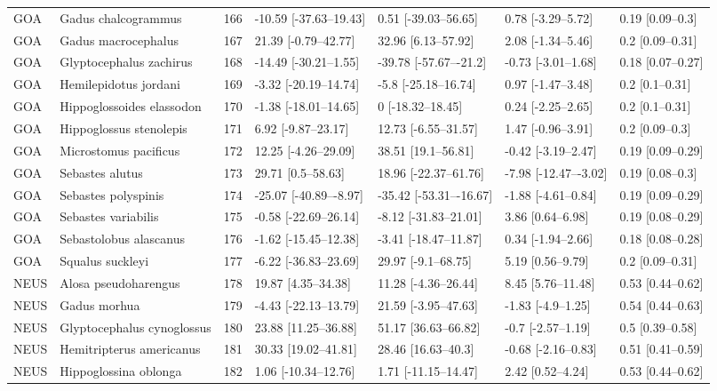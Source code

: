 \begin{longtable}[t]{lllllll}
\addlinespace
GOA & Gadus chalcogrammus & 166 & -10.59 [-37.63–19.43] & 0.51 [-39.03–56.65] & 0.78 [-3.29–5.72] & 0.19 [0.09–0.3]\\
GOA & Gadus macrocephalus & 167 & 21.39 [-0.79–42.77] & 32.96 [6.13–57.92] & 2.08 [-1.34–5.46] & 0.2 [0.09–0.31]\\
GOA & Glyptocephalus zachirus & 168 & -14.49 [-30.21–1.55] & -39.78 [-57.67–-21.2] & -0.73 [-3.01–1.68] & 0.18 [0.07–0.27]\\
GOA & Hemilepidotus jordani & 169 & -3.32 [-20.19–14.74] & -5.8 [-25.18–16.74] & 0.97 [-1.47–3.48] & 0.2 [0.1–0.31]\\
GOA & Hippoglossoides elassodon & 170 & -1.38 [-18.01–14.65] & 0 [-18.32–18.45] & 0.24 [-2.25–2.65] & 0.2 [0.1–0.31]\\
\addlinespace
GOA & Hippoglossus stenolepis & 171 & 6.92 [-9.87–23.17] & 12.73 [-6.55–31.57] & 1.47 [-0.96–3.91] & 0.2 [0.09–0.3]\\
GOA & Microstomus pacificus & 172 & 12.25 [-4.26–29.09] & 38.51 [19.1–56.81] & -0.42 [-3.19–2.47] & 0.19 [0.09–0.29]\\
GOA & Sebastes alutus & 173 & 29.71 [0.5–58.63] & 18.96 [-22.37–61.76] & -7.98 [-12.47–-3.02] & 0.19 [0.08–0.3]\\
GOA & Sebastes polyspinis & 174 & -25.07 [-40.89–-8.97] & -35.42 [-53.31–-16.67] & -1.88 [-4.61–0.84] & 0.19 [0.09–0.29]\\
GOA & Sebastes variabilis & 175 & -0.58 [-22.69–26.14] & -8.12 [-31.83–21.01] & 3.86 [0.64–6.98] & 0.19 [0.08–0.29]\\
\addlinespace
GOA & Sebastolobus alascanus & 176 & -1.62 [-15.45–12.38] & -3.41 [-18.47–11.87] & 0.34 [-1.94–2.66] & 0.18 [0.08–0.28]\\
GOA & Squalus suckleyi & 177 & -6.22 [-36.83–23.69] & 29.97 [-9.1–68.75] & 5.19 [0.56–9.79] & 0.2 [0.09–0.31]\\
NEUS & Alosa pseudoharengus & 178 & 19.87 [4.35–34.38] & 11.28 [-4.36–26.44] & 8.45 [5.76–11.48] & 0.53 [0.44–0.62]\\
NEUS & Gadus morhua & 179 & -4.43 [-22.13–13.79] & 21.59 [-3.95–47.63] & -1.83 [-4.9–1.25] & 0.54 [0.44–0.63]\\
NEUS & Glyptocephalus cynoglossus & 180 & 23.88 [11.25–36.88] & 51.17 [36.63–66.82] & -0.7 [-2.57–1.19] & 0.5 [0.39–0.58]\\
\addlinespace
NEUS & Hemitripterus americanus & 181 & 30.33 [19.02–41.81] & 28.46 [16.63–40.3] & -0.68 [-2.16–0.83] & 0.51 [0.41–0.59]\\
NEUS & Hippoglossina oblonga & 182 & 1.06 [-10.34–12.76] & 1.71 [-11.15–14.47] & 2.42 [0.52–4.24] & 0.53 [0.44–0.62]\\

\end{longtable}
